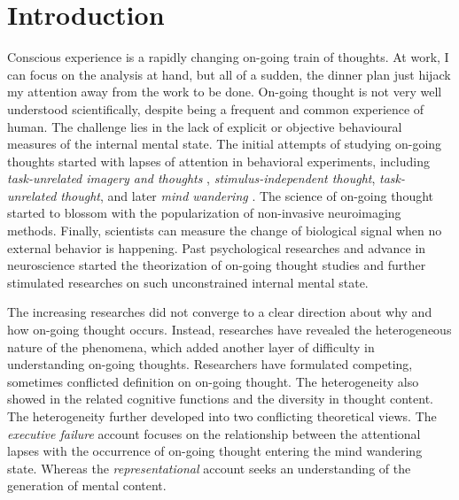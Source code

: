 \chapter{Introduction}
\label{ch:intro}

\newpage

\noindent Conscious experience is a rapidly changing on-going train of thoughts. At work, I can focus on the analysis at hand, but all of a sudden, the dinner plan just hijack my attention away from the work to be done. On-going thought is not very well understood scientifically, despite being a frequent and common experience of human. The challenge lies in the lack of explicit or objective behavioural measures of the internal mental state. The initial attempts of studying on-going thoughts started with lapses of attention in behavioral experiments, including \textit{task-unrelated imagery and thoughts} \cite{Giambra1995}, \textit{stimulus-independent thought}\cite{Antrobus1968}, \textit{task-unrelated thought}, and later \textit{mind wandering} \cite{SmallwoodSchooler2015}. The science of on-going thought started to blossom with the popularization of non-invasive neuroimaging methods. Finally, scientists can measure the change of biological signal when no external behavior is happening. Past psychological researches and advance in neuroscience started the theorization of on-going thought studies and further stimulated researches on such unconstrained internal mental state. 

The increasing researches did not converge to a clear direction about why and how on-going thought occurs. Instead, researches have revealed the heterogeneous nature of the phenomena, which added another layer of difficulty in understanding on-going thoughts. Researchers have formulated competing, sometimes conflicted definition on on-going thought. The heterogeneity also showed in the related cognitive functions and the diversity in thought content. The heterogeneity further developed into two conflicting theoretical views. The \textit{executive failure} account focuses on the relationship between the attentional lapses with the occurrence of on-going thought entering the mind wandering state. Whereas the \textit{representational} account seeks an understanding of the generation of mental content. 

